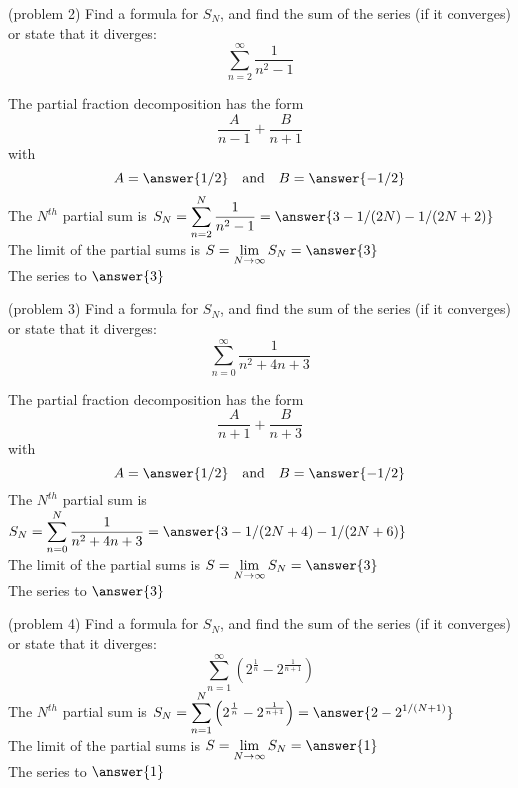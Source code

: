 \documentclass[handout]{ximera}
\begin{document}
\begin{problem}(problem 2)
Find a formula for $S_N$, and find the sum of the series (if it converges) or state that it diverges:
\[
\sum_{n=2}^\infty \frac{1}{n^2 - 1}    
\]

The partial fraction decomposition has the form
\[
\frac{A}{n-1} + \frac{B}{n+1}
\]
with 
\[
A = \answer{1/2} \quad \mbox{and} \quad B = \answer{-1/2}
\]
The $N^{th}$ partial sum is  $\displaystyle S_N = \sum_{n=2}^N \frac{1}{n^2 - 1} =  \answer{3 - 1/(2N) - 1/(2N+2)}$\\
The limit of the partial sums is $\displaystyle S = \lim_{N\to \infty}S_N = \answer{3}$\\
The series  to $\answer{3}$

\end{problem}

\begin{problem}(problem 3)
Find a formula for $S_N$, and find the sum of the series (if it converges) or state that it diverges:
\[
\sum_{n=0}^\infty \frac{1}{n^2 + 4n + 3}    
\]

The partial fraction decomposition has the form
\[
\frac{A}{n+1} + \frac{B}{n+3}
\]
with 
\[
A = \answer{1/2} \quad \mbox{and} \quad B = \answer{-1/2}
\]
The $N^{th}$ partial sum is  $\displaystyle S_N = \sum_{n=0}^N \frac{1}{n^2 + 4n + 3} =  \answer{3 -  1/(2N+4)-  1/(2N+6)}$\\
The limit of the partial sums is $\displaystyle S = \lim_{N\to \infty}S_N = \answer{3}$\\
The series  to $\answer{3}$

\end{problem}


\begin{problem}(problem 4)
Find a formula for $S_N$, and find the sum of the series (if it converges) or state that it diverges:
\[
\sum_{n=1}^\infty \left( 2^{\frac{1}{n}} - 2^{\frac{1}{n+1}}\right) 
\]
The $N^{th}$ partial sum is  $\displaystyle S_N = \sum_{n=1}^N \left( 2^{\frac{1}{n}} - 2^{\frac{1}{n+1}}\right) =  \answer{2 - 2^{1/(N+1)}}$\\
The limit of the partial sums is $\displaystyle S = \lim_{N\to \infty}S_N = \answer{1}$\\
The series  to $\answer{1}$

\end{problem}
\end{document}
